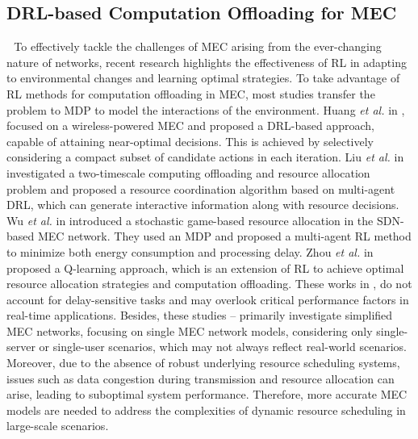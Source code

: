 \documentclass[12pt,draftclsnofoot,onecolumn]{IEEEtran}
\newenvironment{my}[2]%
{\begin{list}{}%
{\setlength{\rightmargin}{#1}\setlength{\leftmargin}{#2}}%


 \item[]{}

} {\end{list}}
\begin{document}
\begin{enumerate}
\begin{my}{1cm}{1cm}
{		\subsection{DRL-based Computation Offloading for MEC}
		\,\,\,\,To effectively tackle the challenges of MEC arising from the ever-changing nature of networks, recent research highlights the effectiveness of RL in adapting to environmental changes and learning optimal strategies. To take advantage of RL methods for computation offloading in MEC, most studies transfer the problem to MDP to model the interactions of the environment.
		Huang \textit{et al.} in \cite{huang2019deep}, focused on a wireless-powered MEC and proposed a DRL-based approach, capable of attaining near-optimal decisions. This is achieved by selectively considering a compact subset of candidate actions in each iteration. Liu \textit{et al.} in \cite{liu2021learn} investigated a two-timescale computing offloading and resource allocation problem and proposed a resource coordination algorithm based on multi-agent DRL, which can generate interactive information along with resource decisions. 
		Wu \textit{et al.} in \cite{wu2023computation} introduced a stochastic game-based resource allocation in the SDN-based MEC network. They used an MDP and proposed a multi-agent RL method to minimize both energy consumption and processing delay. Zhou \textit{et al.} in \cite{zhou2021deep} proposed a Q-learning approach, which is an extension of RL to achieve optimal resource allocation strategies and computation offloading. 
		These works in \cite{huang2019deep}, \cite{liu2021learn} do not account for delay-sensitive tasks and may overlook critical performance factors in real-time applications. Besides, these studies \cite{huang2019deep}--\cite{zhou2021deep} primarily investigate simplified MEC networks, focusing on single MEC network models, considering only single-server or single-user scenarios, which may not always reflect real-world scenarios. 
		Moreover, due to the absence of robust underlying resource scheduling systems, issues such as data congestion during transmission and resource allocation can arise, leading to suboptimal system performance. Therefore, more accurate MEC models are needed to address the complexities of dynamic resource scheduling in large-scale scenarios. \vspace{2mm}
		
}
\end{my}
\end{enumerate}
\end{document}
